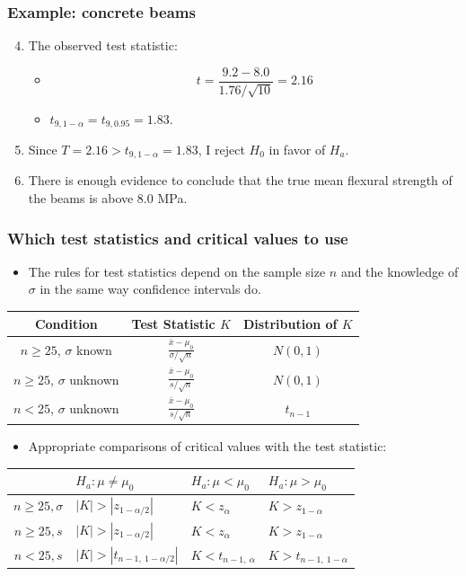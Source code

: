 \documentclass[handout]{beamer}\usepackage[]{graphicx}\usepackage[]{color}
\numberwithin{equation}{section}
\begin{document}
\begin{frame}
\frametitle{Example: concrete beams}
\begin{enumerate}
\setcounter{enumi}{3}
\item The observed test statistic:
\begin{itemize}
\pause \item \[t = \frac{9.2 -  8.0}{1.76/\sqrt{10}} = 2.16\]
\pause \item $t_{9,1-\alpha} = t_{9,0.95} = 1.83$.
\end{itemize}
\pause \item Since $T = 2.16 > t_{9,1-\alpha} = 1.83$, I reject $H_0$ in favor of $H_a$.
\pause \item There is enough evidence to conclude that the true mean flexural strength of the beams is above 8.0 MPa.
\end{enumerate}
\end{frame}


\begin{frame}
\frametitle{Which test statistics and critical values to use} \scriptsize
\begin{itemize}
\item The rules for test statistics depend on the sample size $n$ and the knowledge of $\sigma$ in the same way confidence intervals do.
\end{itemize}
\pause \begin{tabular}{c|cc}
Condition & Test Statistic $K$& Distribution of $K$ \\ \hline
$n \ge 25$, $\sigma$ known  & $\displaystyle \frac{\bar{x} - \mu_0}{\sigma/\sqrt{n}} $& $N(0,1)$  \\ [2.5ex]
$n \ge 25$, $\sigma$ unknown  &  $\displaystyle \frac{\bar{x}-\mu_0}{s/\sqrt{n}}$ & $N(0,1)$ \\ [2.5ex]
$n < 25$, $\sigma$ unknown  & $\displaystyle \frac{\bar{x}-\mu_0}{s/\sqrt{n}}$ & $t_{n-1}$   \\ [2.5ex]
\end{tabular}
\begin{itemize}
\pause \item Appropriate comparisons of critical values with the test statistic:
\end{itemize}
\pause \begin{tabular}{c|lll}
 & $H_a: \mu \ne \mu_0$ & $H_a: \mu < \mu_0$ & $H_a: \mu > \mu_0$  \\ \hline
$n \ge 25, \sigma$ & $|K| > |z_{1- \alpha/2}| $& $K < z_{\alpha}$ & $K > z_{1-\alpha}$ \\ [2.5ex]
$n \ge 25, s$ & $|K| > |z_{1 - \alpha/2}| $ & $K < z_{\alpha}$ &  $K > z_{1-\alpha}$\\ [2.5ex]
$n < 25, s$    & $|K| > |t_{n - 1,\  1 - \alpha/2}|$ & $K < t_{n - 1,\ \alpha}$ &$K > t_{n - 1, \ 1- \alpha}$   \\ [2.5ex]
\end{tabular}
\end{frame}
\end{document}
